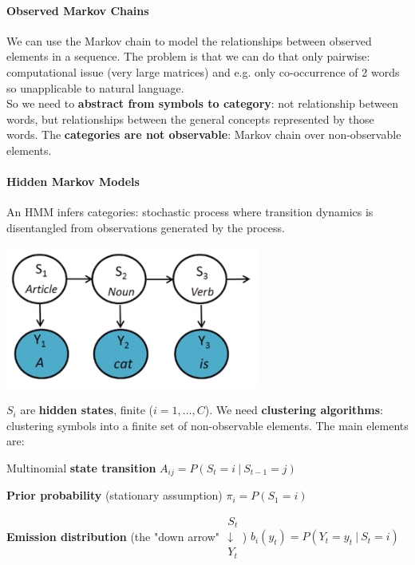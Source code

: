 \documentclass[10pt]{report}
\begin{document}
\paragraph{Observed Markov Chains} We can use the Markov chain to model the relationships between observed elements in a sequence. The problem is that we can do that only pairwise: computational issue (very large matrices) and e.g. only co-occurrence of 2 words so unapplicable to natural language.\\
So we need to \textbf{abstract from symbols to category}: not relationship between words, but relationships between the general concepts represented by those words. The \textbf{categories are not observable}: Markov chain over non-observable elements.
\paragraph{Hidden Markov Models} An HMM infers categories: stochastic process where transition dynamics is disentangled from observations generated by the process.\begin{center}
	\includegraphics[scale=0.5]{27.png}
\end{center}
$S_i$ are \textbf{hidden states}, finite ($i = 1,\ldots,C$). We need \textbf{clustering algorithms}: clustering symbols into a finite set of non-observable elements. The main elements are:
\begin{list}{}{}
	\item Multinomial \textbf{state transition} $A_{ij} = P(S_t=i\:|\:S_{t-1}=j)$
	\item \textbf{Prior probability} (stationary assumption) $\pi_i = P(S_1=i)$
	\item \textbf{Emission distribution} (the "down arrow" $\begin{array}{c}
S_t\\\downarrow\\Y_t
\end{array}$) $b_i(y_t) = P(Y_t = y_t\:|\:S_t = i)$
\end{list}
\end{document}
